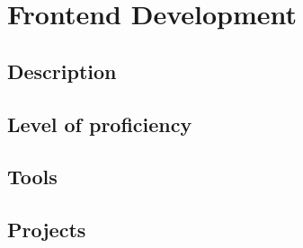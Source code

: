 \section{Frontend Development}

\subsection{Description}
\subsection{Level of proficiency}
\subsection{Tools}
\subsection{Projects}

\newpage
